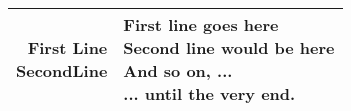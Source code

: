 \documentclass{article}
\begin{document}
\begin{tabular}{|r|l|}
    \hline
    \parbox[t][3cm][c]{3cm}{\raggedleft First Line\\SecondLine} &
    \parbox[t][6cm][c]{7cm}{\textbf{First line goes here}\\
                 Second line would be here\\
                 And so on, ...\\
                 ... until the very end.} \\
    \hline
\end{tabular}
\end{document}
